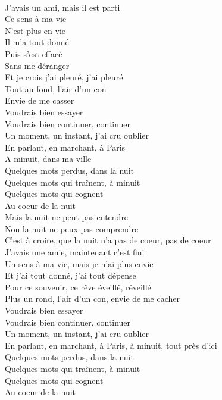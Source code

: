 \\
J'avais un ami, mais il est parti \\
Ce sens à ma vie \\
N'est plus en vie \\
Il m'a tout donné \\
Puis s'est effacé \\
Sans me déranger \\
Et je crois j'ai pleuré, j'ai pleuré \\
Tout au fond, l'air d'un con \\
Envie de me casser \\
Voudrais bien essayer \\
Voudrais bien continuer, continuer \\
Un moment, un instant, j'ai cru oublier \\
En parlant, en marchant, à Paris \\
A minuit, dans ma ville \\
Quelques mots perdus, dans la nuit \\
Quelques mots qui traînent, à minuit \\
Quelques mots qui cognent \\
Au coeur de la nuit \\
Mais la nuit ne peut pas entendre \\
Non la nuit ne peux pas comprendre \\
C'est à croire, que la nuit n'a pas de coeur, pas de coeur \\
J'avais une amie, maintenant c'est fini \\
Un sens à ma vie, mais je n'ai plus envie \\
Et j'ai tout donné, j'ai tout dépense \\
Pour ce souvenir, ce rêve éveillé, réveillé \\
Plus un rond, l'air d'un con, envie de me cacher \\
Voudrais bien essayer \\
Voudrais bien continuer, continuer \\
Un moment, un instant, j'ai cru oublier \\
En parlant, en marchant, à Paris, à minuit, tout près d'ici \\
Quelques mots perdus, dans la nuit \\
Quelques mots qui traînent, à minuit \\
Quelques mots qui cognent \\
Au coeur de la nuit \\
